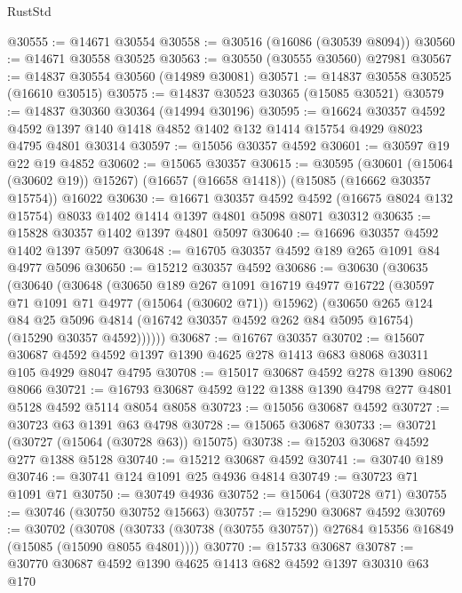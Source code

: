 \begin{lexlean}{RustStd}
\begin{coremodule}
@30555 := @14671 @30554
@30558 := @30516 (@16086 (@30539 @8094))
@30560 := @14671 @30558 @30525
@30563 := @30550 (@30555 @30560) @27981
@30567 := @14837 @30554 @30560 (@14989 @30081)
@30571 := @14837 @30558 @30525 (@16610 @30515)
@30575 := @14837 @30523 @30365 (@15085 @30521)
@30579 := @14837 @30360 @30364 (@14994 @30196)
@30595 := @16624
    @30357
    @4592
    @4592
    @1397
    @140
    @1418
    @4852
    @1402
    @132
    @1414
    @15754
    @4929
    @8023
    @4795
    @4801
    @30314
@30597 := @15056 @30357 @4592
@30601 := @30597 @19 @22 @19 @4852
@30602 := @15065 @30357
@30615 := @30595
    (@30601 (@15064 (@30602 @19)) @15267)
    (@16657 (@16658 @1418))
    (@15085 (@16662 @30357 @15754))
    @16022
@30630 := @16671
    @30357
    @4592
    @4592
    (@16675 @8024 @132 @15754)
    @8033
    @1402
    @1414
    @1397
    @4801
    @5098
    @8071
    @30312
@30635 := @15828 @30357 @1402 @1397 @4801 @5097
@30640 := @16696 @30357 @4592 @1402 @1397 @5097
@30648 := @16705 @30357 @4592 @189 @265 @1091 @84 @4977 @5096
@30650 := @15212 @30357 @4592
@30686 := @30630
    (@30635
      (@30640
        (@30648
          (@30650
            @189
            @267
            @1091
            @16719
            @4977
            @16722
            (@30597 @71 @1091 @71 @4977 (@15064 (@30602 @71)) @15962)
            (@30650
              @265
              @124
              @84
              @25
              @5096
              @4814
              (@16742 @30357 @4592 @262 @84 @5095 @16754)
              (@15290 @30357 @4592))))))
@30687 := @16767 @30357
@30702 := @15607
    @30687
    @4592
    @4592
    @1397
    @1390
    @4625
    @278
    @1413
    @683
    @8068
    @30311
    @105
    @4929
    @8047
    @4795
@30708 := @15017 @30687 @4592 @278 @1390 @8062 @8066
@30721 := @16793 @30687 @4592 @122 @1388 @1390 @4798 @277 @4801 @5128 @4592 @5114 @8054 @8058
@30723 := @15056 @30687 @4592
@30727 := @30723 @63 @1391 @63 @4798
@30728 := @15065 @30687
@30733 := @30721 (@30727 (@15064 (@30728 @63)) @15075)
@30738 := @15203 @30687 @4592 @277 @1388 @5128
@30740 := @15212 @30687 @4592
@30741 := @30740 @189
@30746 := @30741 @124 @1091 @25 @4936 @4814
@30749 := @30723 @71 @1091 @71
@30750 := @30749 @4936
@30752 := @15064 (@30728 @71)
@30755 := @30746 (@30750 @30752 @15663)
@30757 := @15290 @30687 @4592
@30769 := @30702
    (@30708 (@30733 (@30738 (@30755 @30757)) @27684 @15356 @16849 (@15085 (@15090 @8055 @4801))))
@30770 := @15733 @30687
@30787 := @30770
    @30687
    @4592
    @1390
    @4625
    @1413
    @682
    @4592
    @1397
    @30310
    @63
    @170

\end{coremodule}
\end{lexlean}
